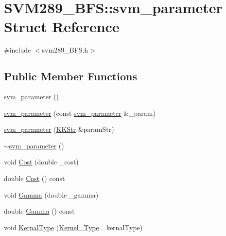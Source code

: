 \hypertarget{struct_s_v_m289___b_f_s_1_1svm__parameter}{}\section{S\+V\+M289\+\_\+\+B\+FS\+:\+:svm\+\_\+parameter Struct Reference}
\label{struct_s_v_m289___b_f_s_1_1svm__parameter}


{\ttfamily \#include $<$svm289\+\_\+\+B\+F\+S.\+h$>$}

\subsection*{Public Member Functions}
\begin{DoxyCompactItemize}
\item 
\hyperlink{struct_s_v_m289___b_f_s_1_1svm__parameter_a124973d58b948bf0214ef95ece79e61a}{svm\+\_\+parameter} ()
\item 
\hyperlink{struct_s_v_m289___b_f_s_1_1svm__parameter_a361874672d09d149788cc30921fd4a28}{svm\+\_\+parameter} (const \hyperlink{struct_s_v_m289___b_f_s_1_1svm__parameter}{svm\+\_\+parameter} \&\+\_\+param)
\item 
\hyperlink{struct_s_v_m289___b_f_s_1_1svm__parameter_a1eb9f42dc0df00e1b98e05e9609c6ee7}{svm\+\_\+parameter} (\hyperlink{class_k_k_b_1_1_k_k_str}{K\+K\+Str} \&param\+Str)
\item 
\hyperlink{struct_s_v_m289___b_f_s_1_1svm__parameter_a0fca2845c7e31a29b3663a76e62f6a94}{$\sim$svm\+\_\+parameter} ()
\item 
void \hyperlink{struct_s_v_m289___b_f_s_1_1svm__parameter_aa6ff167f598b8d5319b61058c0072f5c}{Cost} (double \+\_\+cost)
\item 
double \hyperlink{struct_s_v_m289___b_f_s_1_1svm__parameter_a43c831f848a3e426a04797b4300ff451}{Cost} () const 
\item 
void \hyperlink{struct_s_v_m289___b_f_s_1_1svm__parameter_a7a47eae7f9c25c42cbbb9c6c3e92b598}{Gamma} (double \+\_\+gamma)
\item 
double \hyperlink{struct_s_v_m289___b_f_s_1_1svm__parameter_adf1f2ce2784d084f65607ade3bc9f4f9}{Gamma} () const 
\item 
void \hyperlink{struct_s_v_m289___b_f_s_1_1svm__parameter_a115e36187a488d91113bed5d92463481}{Kernal\+Type} (\hyperlink{namespace_s_v_m289___b_f_s_aad17f5250658b3fe42ba842df2ef2c6d}{Kernel\+\_\+\+Type} \+\_\+kernal\+Type)
\item 

\end{DoxyCompactItemize}

